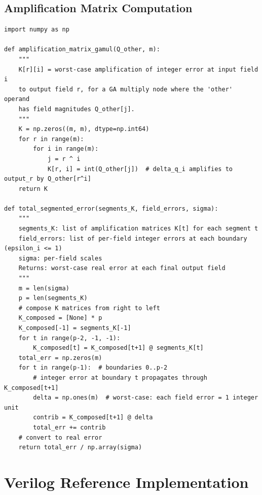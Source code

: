 \documentclass[11pt,a4paper]{article}
\theoremstyle{definition}
\theoremstyle{plain}
\theoremstyle{remark}
\begin{document}
\subsection{Amplification Matrix Computation}

\begin{lstlisting}[caption={Amplification matrix for segmentation error},label=lst:amp]
import numpy as np

def amplification_matrix_gamul(Q_other, m):
    """
    K[r][i] = worst-case amplification of integer error at input field i
    to output field r, for a GA multiply node where the 'other' operand
    has field magnitudes Q_other[j].
    """
    K = np.zeros((m, m), dtype=np.int64)
    for r in range(m):
        for i in range(m):
            j = r ^ i
            K[r, i] = int(Q_other[j])  # delta_q_i amplifies to output_r by Q_other[r^i]
    return K

def total_segmented_error(segments_K, field_errors, sigma):
    """
    segments_K: list of amplification matrices K[t] for each segment t
    field_errors: list of per-field integer errors at each boundary (epsilon_i <= 1)
    sigma: per-field scales
    Returns: worst-case real error at each final output field
    """
    m = len(sigma)
    p = len(segments_K)
    # compose K matrices from right to left
    K_composed = [None] * p
    K_composed[-1] = segments_K[-1]
    for t in range(p-2, -1, -1):
        K_composed[t] = K_composed[t+1] @ segments_K[t]
    total_err = np.zeros(m)
    for t in range(p-1):  # boundaries 0..p-2
        # integer error at boundary t propagates through K_composed[t+1]
        delta = np.ones(m)  # worst-case: each field error = 1 integer unit
        contrib = K_composed[t+1] @ delta
        total_err += contrib
    # convert to real error
    return total_err / np.array(sigma)
\end{lstlisting}

\section{Verilog Reference Implementation}
\label{app:verilog}
\end{document}
